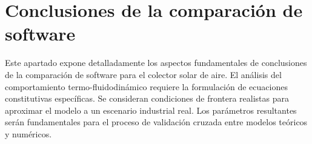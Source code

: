 \section{Conclusiones de la comparación de software}
\label{sec:cap10_conclusiones_software}

Este apartado expone detalladamente los aspectos fundamentales de conclusiones de la comparación de software para el colector solar de aire.
El análisis del comportamiento termo-fluidodinámico requiere la formulación de ecuaciones constitutivas específicas.
Se consideran condiciones de frontera realistas para aproximar el modelo a un escenario industrial real.
Los parámetros resultantes serán fundamentales para el proceso de validación cruzada entre modelos teóricos y numéricos.
